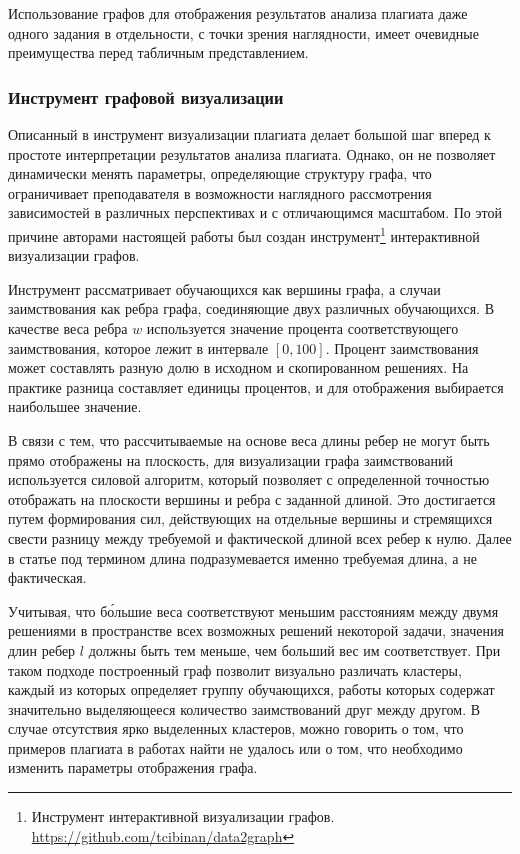\documentclass[a4paper,14pt]{extarticle}
\begin{document}
Использование графов для отображения результатов анализа плагиата даже одного задания в отдельности, с точки зрения наглядности, имеет очевидные преимущества перед табличным представлением.

\subsubsection{Инструмент графовой визуализации}

Описанный в \citep{plagiarismGraph}  инструмент визуализации плагиата делает большой шаг вперед к простоте интерпретации результатов анализа плагиата. Однако, он не позволяет динамически менять параметры, определяющие структуру графа, что ограничивает преподавателя в возможности наглядного рассмотрения зависимостей в различных перспективах и с отличающимся масштабом. По этой причине авторами настоящей работы был создан инструмент\footnote{Инструмент интерактивной визуализации графов. \url{https://github.com/tcibinan/data2graph}} интерактивной визуализации графов.

Инструмент рассматривает обучающихся как вершины графа, а случаи заимствования как ребра графа, соединяющие двух различных обучающихся. В качестве веса ребра $w$ используется значение процента соответствующего заимствования, которое лежит в интервале $[0,100]$. Процент заимствования может составлять разную долю в исходном и скопированном решениях. На практике разница составляет единицы процентов, и для отображения выбирается наибольшее значение.

В связи с тем, что рассчитываемые на основе веса длины ребер не могут быть прямо отображены на плоскость, для визуализации графа заимствований используется силовой алгоритм, который позволяет с определенной точностью отображать на плоскости вершины и ребра с заданной длиной. Это достигается путем формирования сил, действующих на отдельные вершины и стремящихся свести разницу между требуемой и фактической длиной всех ребер к нулю. Далее в статье под термином длина подразумевается именно требуемая длина, а не фактическая.

Учитывая, что б\'{о}льшие веса соответствуют меньшим расстояниям между двумя решениями в пространстве всех возможных решений некоторой задачи, значения длин ребер $l$ должны быть тем меньше, чем больший вес им соответствует. При таком подходе построенный граф позволит визуально различать кластеры, каждый из которых определяет группу обучающихся, работы которых содержат значительно выделяющееся количество заимствований друг между другом. В случае отсутствия ярко выделенных кластеров, можно говорить о том, что примеров плагиата в работах найти не удалось или о том, что необходимо изменить параметры отображения графа.
\end{document}
